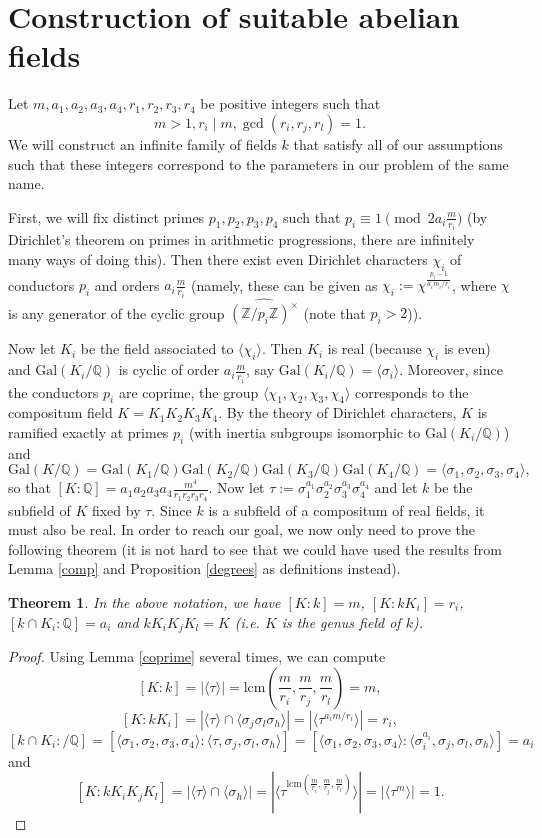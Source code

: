 \documentclass[12pt,a4paper]{article}
\newtheorem{theorem}{Theorem}
\newcommand{\Q}{\mathbb{Q}}
\newcommand{\Z}{\mathbb{Z}}
\newcommand{\Gal}{\mathrm{Gal}}
\newcommand{\lcm}{\mathrm{lcm}}
\begin{document}
\section{Construction of suitable abelian fields}
Let $m,a_1,a_2,a_3,a_4,r_1,r_2,r_3,r_4$ be positive integers such that 
$$m>1, r_i\mid m, \gcd(r_i,r_j,r_l)=1.$$
We will construct an infinite family of fields $k$ that satisfy all of our assumptions such that these integers correspond to the parameters in our problem of the same name.

First, we will fix distinct primes $p_1,p_2,p_3,p_4$ such that $p_i\equiv 1\pmod{ 2a_i\frac{m}{r_i}}$ (by Dirichlet's theorem on primes in arithmetic progressions, there are infinitely many ways of doing this). Then there exist even Dirichlet characters $\chi_i$ of conductors $p_i$ and orders $a_i\frac{m}{r_i}$ (namely, these can be given as $\chi_i:=\chi^{\frac{p_i-1}{a_im_i/r_i}}$, where $\chi$ is any generator of the cyclic group $\widehat{(\Z/p_i\Z)^\times}$ (note that $p_i>2$)).

Now let $K_i$ be the field associated to $\langle \chi_i\rangle$. Then $K_i$ is real (because $\chi_i$ is even) and $\Gal(K_i/\Q)$ is cyclic of order $a_i\frac{m}{r_i}$, say $\Gal(K_i/\Q)=\langle \sigma_i\rangle$. Moreover, since the conductors $p_i$ are coprime, the group $\langle \chi_1,\chi_2,\chi_3,\chi_4\rangle$ corresponds to the compositum field $K=K_1K_2K_3K_4$. By the theory of Dirichlet characters, $K$ is ramified exactly at primes $p_i$ (with inertia subgroups isomorphic to $\Gal(K_i/\Q)$) and $$\Gal(K/\Q)=\Gal(K_1/\Q)\Gal(K_2/\Q)\Gal(K_3/\Q)\Gal(K_4/\Q)=\langle\sigma_1,\sigma_2,\sigma_3,\sigma_4\rangle,$$
so that $[K:\Q]=a_1a_2a_3a_4\frac{m^4}{r_1r_2r_3r_4}$. Now let $\tau:=\sigma_1^{a_1}\sigma_2^{a_2}\sigma_3^{a_3}\sigma_4^{a_4}$ and let $k$ be the subfield of $K$ fixed by $\tau$. Since $k$ is a subfield of a compositum of real fields, it must also be real. In order to reach our goal, we now only need to prove the following theorem (it is not hard to see that we could have used the results from Lemma \ref{comp} and Proposition \ref{degrees} as definitions instead).

\begin{theorem}
In the above notation, we have $[K:k]=m$, $[K:kK_i]=r_i$, $[k\cap K_i:\Q]=a_i$ and $kK_iK_jK_l=K$ (i.e. $K$ is the genus field of $k$).
\end{theorem}
\begin{proof}
Using Lemma \ref{coprime} several times, we can compute
$$[K:k]=|\langle\tau\rangle|=\lcm\left(\frac{m}{r_i},\frac{m}{r_j},\frac{m}{r_l}\right)=m,$$
$$[K:kK_i]=|\langle\tau\rangle\cap \langle\sigma_j\sigma_l\sigma_h\rangle|=|\langle\tau^{a_im/r_i}\rangle|=r_i,$$
$$[k\cap K_i:/\Q]=[\langle\sigma_1,\sigma_2,\sigma_3,\sigma_4\rangle:\langle\tau,\sigma_j,\sigma_l,\sigma_h\rangle]=[\langle\sigma_1,\sigma_2,\sigma_3,\sigma_4\rangle:\langle\sigma_i^{a_i},\sigma_j,\sigma_l,\sigma_h\rangle]=a_i$$
and
$$[K:kK_iK_jK_l]=|\langle\tau\rangle\cap \langle\sigma_h\rangle|=|\langle\tau^{\lcm\left(\frac{m}{r_i},\frac{m}{r_j},\frac{m}{r_l}\right)}\rangle|=|\langle\tau^m\rangle|=1.$$
\end{proof}
\end{document}
